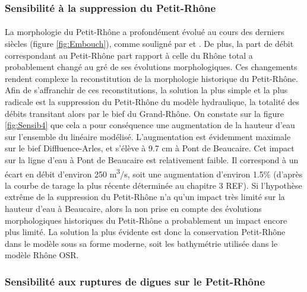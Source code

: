\documentclass[11pt]{article}
\begin{document}
	\subsubsection{Sensibilité à la suppression du Petit-Rhône} 
	
	\paragraph{} La morphologie du Petit-Rhône a profondément évolué au cours des derniers siècles (figure \ref{fig:Embouch}), comme souligné par \citet{pichard_les_2014} et \citet{raccasi_mutations_2008}. De plus, la part de débit correspondant au Petit-Rhône part rapport à celle du Rhône total a probablement changé au gré de ses évolutions morphologiques. Ces changements rendent complexe la reconstitution de la morphologie historique du Petit-Rhône. Afin de s'affranchir de ces reconstitutions, la solution la plus simple et la plus radicale est la suppression du Petit-Rhône du modèle hydraulique, la totalité des débits transitant alors par le bief du Grand-Rhône. On constate sur la figure \ref{fig:Sensib4} que cela a pour conséquence une augmentation de la hauteur d'eau sur l'ensemble du linéaire modélisé. L'augmentation est évidemment maximale sur le bief Diffluence-Arles, et s'élève à 9.7 cm à Pont de Beaucaire. Cet impact sur la ligne d'eau à Pont de Beaucaire est relativement faible. Il correspond à un écart en débit d'environ 250 m\textsuperscript{3}/s, soit une augmentation d'environ 1.5\% (d'après la courbe de tarage la plus récente déterminée au chapitre 3 REF). Si l'hypothèse extrême de la suppression du Petit-Rhône n'a qu'un impact très limité sur la hauteur d'eau à Beaucaire, alors la non prise en compte des évolutions morphologiques historiques du Petit-Rhône a probablement un impact encore plus limité. La solution la plus évidente est donc la conservation Petit-Rhône dans le modèle sous sa forme moderne, soit les bathymétrie utilisée dans le modèle Rhône OSR.
	
	\subsubsection{Sensibilité aux ruptures de digues sur le Petit-Rhône}
	
\end{document}
